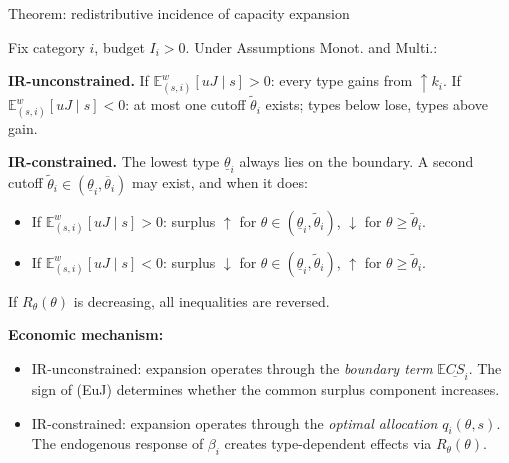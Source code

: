\documentclass[10pt, aspectratio=169]{beamer}
\newcommand{\E}{\mathbb{E}}
\begin{document}
\begin{frame}{Theorem: redistributive incidence of capacity expansion}
\begin{theorem}
Fix category $i$, budget $I_i > 0$. Under Assumptions Monot. and Multi.:

\textbf{IR-unconstrained.} If $\E_{(s,i)}^w[uJ \mid s] > 0$: every type gains from $\uparrow k_i$. If $\E_{(s,i)}^w[uJ \mid s] < 0$: at most one cutoff $\tilde\theta_i$ exists; types below lose, types above gain.

\textbf{IR-constrained.} The lowest type $\underline{\theta}_i$ always lies on the boundary. A second cutoff $\tilde\theta_i \in (\underline{\theta}_i, \overline{\theta}_i)$ may exist, and when it does:
\begin{itemize}
\item[(i)] If $\E_{(s,i)}^w[uJ \mid s] > 0$: surplus $\uparrow$ for $\theta \in (\underline{\theta}_i, \tilde\theta_i)$, $\downarrow$ for $\theta \geq \tilde\theta_i$.
\item[(ii)] If $\E_{(s,i)}^w[uJ \mid s] < 0$: surplus $\downarrow$ for $\theta \in (\underline{\theta}_i, \tilde\theta_i)$, $\uparrow$ for $\theta \geq \tilde\theta_i$.
\end{itemize}
If $R_\theta(\theta)$ is decreasing, all inequalities are reversed.
\end{theorem}
\vspace{0.2cm}
\textbf{Economic mechanism:}
\begin{itemize}
\item IR-unconstrained: expansion operates through the \emph{boundary term} $\E\underline{CS}_i$. The sign of (EuJ) determines whether the common surplus component increases.
\item IR-constrained: expansion operates through the \emph{optimal allocation} $q_i(\theta,s)$. The endogenous response of $\beta_i$ creates type-dependent effects via $R_\theta(\theta)$.
\end{itemize}
\end{frame}
\end{document}

